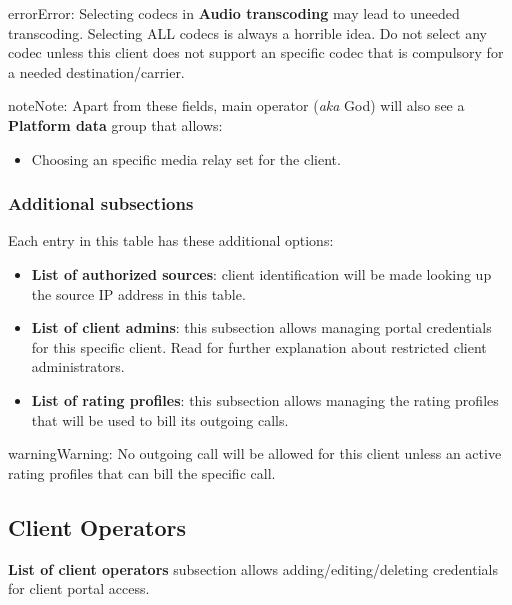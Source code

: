 \documentclass[letterpaper,10pt,english]{sphinxmanual}
\begin{document}
\begin{notice}{error}{Error:}
Selecting codecs in \textbf{Audio transcoding} may lead to uneeded transcoding. Selecting ALL codecs is
always a horrible idea. Do not select any codec unless this client does not support an specific codec
that is compulsory for a needed destination/carrier.
\end{notice}

\begin{notice}{note}{Note:}
Apart from these fields, main operator (\emph{aka} God) will also see a \textbf{Platform data} group that allows:
\begin{itemize}
\item {} 
Choosing an specific media relay set for the client.

\end{itemize}
\end{notice}


\subsubsection{Additional subsections}
\label{administration_portal/brand/clients/wholesale:additional-subsections}
Each entry in this table has these additional options:
\begin{itemize}
\item {} 
\textbf{List of authorized sources}: client identification will be made looking up the source IP address in this table.

\item {} 
\textbf{List of client admins}: this subsection allows managing portal credentials for this specific client. Read {\hyperref[api_rest/acls:acls]{}}
for further explanation about restricted client administrators.

\item {} 
\textbf{List of rating profiles}: this subsection allows managing the rating profiles that will be used to bill its outgoing calls.

\end{itemize}

\begin{notice}{warning}{Warning:}
No outgoing call will be allowed for this client unless an active rating profiles that can
bill the specific call.
\end{notice}


\subsection{Client Operators}
\label{administration_portal/brand/clients/operators::doc}\label{administration_portal/brand/clients/operators:client-operators}\label{administration_portal/brand/clients/operators:id1}
\textbf{List of client operators} subsection allows adding/editing/deleting credentials for client portal access.
\end{document}
